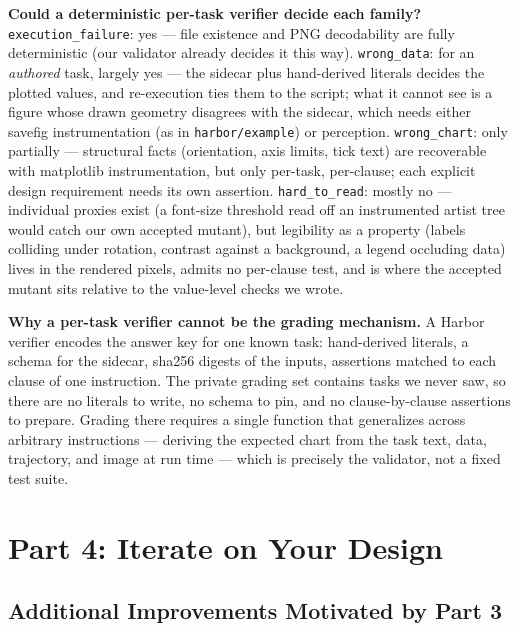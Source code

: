 \documentclass[11pt]{article}
\begin{document}
\textbf{Could a deterministic per-task verifier decide each family?}
\texttt{execution\_failure}: yes --- file existence and PNG decodability are
fully deterministic (our validator already decides it this way).
\texttt{wrong\_data}: for an \emph{authored} task, largely yes --- the sidecar
plus hand-derived literals decides the plotted values, and re-execution ties
them to the script; what it cannot see is a figure whose drawn geometry
disagrees with the sidecar, which needs either savefig instrumentation (as in
\texttt{harbor/example}) or perception. \texttt{wrong\_chart}: only
partially --- structural facts (orientation, axis limits, tick text) are
recoverable with matplotlib instrumentation, but only per-task, per-clause;
each explicit design requirement needs its own assertion.
\texttt{hard\_to\_read}: mostly no --- individual proxies exist (a
font-size threshold read off an instrumented artist tree would catch our
own accepted mutant), but legibility as a property (labels colliding under
rotation, contrast against a background, a legend occluding data) lives in
the rendered pixels, admits no per-clause test, and is where the accepted
mutant sits relative to the value-level checks we wrote.

\textbf{Why a per-task verifier cannot be the grading mechanism.} A Harbor
verifier encodes the answer key for one known task: hand-derived literals, a
schema for the sidecar, sha256 digests of the inputs, assertions matched to
each clause of one instruction. The private grading set contains tasks we
never saw, so there are no literals to write, no schema to pin, and no
clause-by-clause assertions to prepare. Grading there requires a single
function that generalizes across arbitrary instructions --- deriving the
expected chart from the task text, data, trajectory, and image at run time
--- which is precisely the validator, not a fixed test suite.

\section{Part 4: Iterate on Your Design}

\subsection{Additional Improvements Motivated by Part 3}
\end{document}
